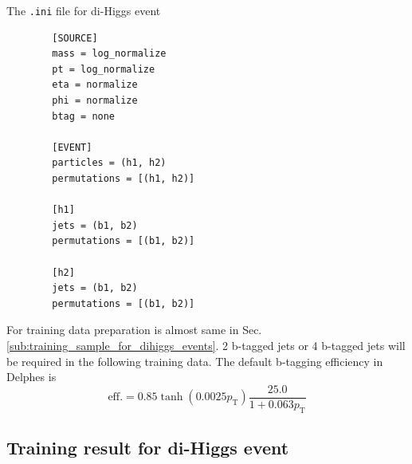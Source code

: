\documentclass[12pt]{article}
\begin{document}
	The \verb+.ini+ file for di-Higgs event
	\begin{verbatim}
		[SOURCE]
		mass = log_normalize
		pt = log_normalize
		eta = normalize
		phi = normalize
		btag = none

		[EVENT]
		particles = (h1, h2)
		permutations = [(h1, h2)]

		[h1]
		jets = (b1, b2)
		permutations = [(b1, b2)]

		[h2]
		jets = (b1, b2)
		permutations = [(b1, b2)]			
	\end{verbatim}

	For training data preparation is almost same in Sec.\ref{sub:training_sample_for_dihiggs_events}. 2 b-tagged jets or 4 b-tagged jets will be required in the following training data. The default b-tagging efficiency in Delphes is 
	\begin{equation}
		\text{eff.} = 0.85 \tanh(0.0025p_\text{T}) \frac{25.0}{1+0.063p_\text{T}}		
	\end{equation}

	\subsection{Training result for di-Higgs event}%
	\label{sub:training_result_for_di_higgs_event_b}
\end{document}

